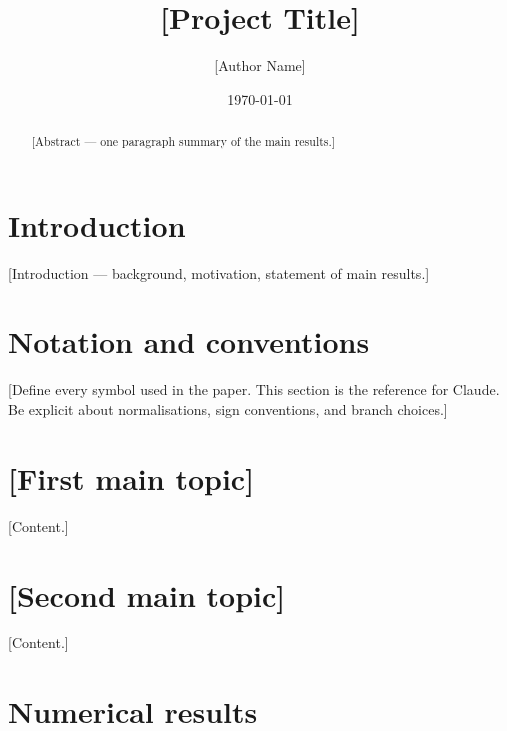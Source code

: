 \documentclass[11pt, a4paper]{article}
\title{[Project Title]}
\author{[Author Name]}
\date{\today}
\theoremstyle{plain}
\theoremstyle{definition}
\begin{document}
\maketitle

\begin{abstract}
[Abstract — one paragraph summary of the main results.]
\end{abstract}

\tableofcontents
\newpage

\section{Introduction}
\label{sec:intro}

[Introduction — background, motivation, statement of main results.]

\section{Notation and conventions}
\label{sec:conventions}

[Define every symbol used in the paper. This section is the reference for
Claude. Be explicit about normalisations, sign conventions, and branch choices.]

\section{[First main topic]}
\label{sec:topic1}

[Content.]

\section{[Second main topic]}
\label{sec:topic2}

[Content.]

\section{Numerical results}
\label{sec:numerics}
\end{document}
